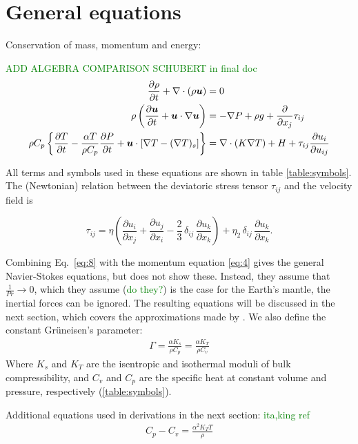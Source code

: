 \documentclass[document.tex]{subfiles}
\begin{document}
\section{\cite{jamc80} General equations}
Conservation of mass, momentum and energy: 

\textcolor{green}{ADD ALGEBRA COMPARISON SCHUBERT in final doc}
\begin{align}
    \pdv{\rho}{t} + \nabla \cdot (\rho\bm{u}) &= 0  \label{eq:3}\\
    \rho\left(\pdv{\bm{u}}{t} + \bm{u} \cdot \nabla \bm{u}\right) &= -\nabla P +\rho g + \pdv{x_j} \tau_{ij} \label{eq:4}\\
    \rho C_p \left\{\pdv{T}{t} - \frac{\alpha T}{\rho C_p}\pdv{P}{t} + \bm{u} \cdot [\nabla T - (\nabla T)_s]\right\} &= 
    \nabla \cdot (K\nabla T) + H + \tau_{ij}\pdv{u_i}{u_{ij}} \label{eq:5}
\end{align}

All terms and symbols used in these equations are shown in table \ref{table:symbols}. 
The (Newtonian) relation between the deviatoric stress tensor $\tau_{ij}$ and the velocity field is

\begin{equation}
\tau_{ij} = \eta \left( \frac{\partial u_i}{\partial x_j} + \frac{\partial u_j}{\partial x_i}
 - \frac{2}{3}\,\delta_{ij}\,\frac{\partial u_k}{\partial x_k} \right) 
 + \eta_2\,\delta_{ij}\,\frac{\partial u_k}{\partial x_k}.
\label{eq:8}
\end{equation}

Combining Eq.~\eqref{eq:8} with the momentum equation \eqref{eq:4} gives the general Navier-Stokes equations, 
but \textcite{jamc80} does not show these. Instead, they assume that $\frac{1}{Pr} \to 0$, which
they assume (\textcolor{green}{do they?}) is the case for the Earth's mantle, the inertial forces can be ignored. The resulting equations 
will be discussed in the next section, which covers the approximations made by \textcite{jamc80}. 
We also define the constant Grüneisen's parameter: 
\begin{align} \label{eq:10}
    \Gamma = \frac{\alpha K_s}{\rho C_p} = \frac{\alpha K_T}{\rho C_v}
\end{align}
Where $K_s$ and $K_T$ are the isentropic and isothermal moduli of bulk compressibility, 
and $C_v$ and $C_p$ are the specific heat at constant volume and pressure, respectively (\ref{table:symbols}).

\begin{mdframed}
    Additional equations used in derivations in the next section: \textcolor{green}{ita,king ref}
    \begin{align} \label{eq:specific_heats}
        C_p - C_v = \frac{\alpha^2K_TT}{\rho}
    \end{align}
\end{mdframed}
\end{document}
